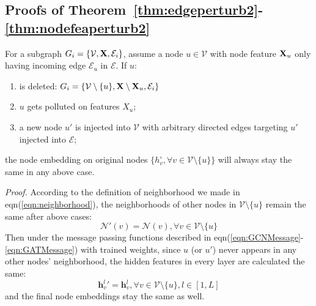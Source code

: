 \subsection{Proofs of Theorem~\ref{thm:edgeperturb2}-\ref{thm:nodefeaperturb2}}
\label{proof:nodepart}
\begin{theorem}%
\label{thm:embUnchange}
For a subgraph $G_{i}=\{\mathcal{V},{\bf X},\mathcal{E}_{i}\}$, assume a node $u\in \mathcal{V}$ with node feature ${\bf X}_{u}$ only having incoming edge $\mathcal{E}_{u}$ in $\mathcal{E}$. If $u$:
\begin{enumerate}
\item is deleted:  $G_{i}=\{\mathcal{V}\setminus\{u\},{\bf X}\setminus\mathbf{X}_{u},\mathcal{E}_{i}\}$
\item $u$ gets polluted on features $X_{u}$; 
\item a new node $u'$ is injected into $\mathcal{V}$ with arbitrary directed edges targeting $u'$ injected into $\mathcal{E}$;
\end{enumerate}
the node embedding on original nodes $\{h^{\circ}_{v},\forall v\in \mathcal{V}\setminus\{u\}\}$ will always stay the same  in any above case.
\end{theorem}
\emph{Proof.} According to the definition of neighborhood we made in eqn(\ref{eqn:neighborhood}), the neighborhoods of other nodes in $\mathcal{V}\setminus\{u\}$ remain the same after above cases:
$$\mathcal{N}'(v) = \mathcal{N}(v), \forall v \in \mathcal{V}\setminus\{u\}$$
Then under the message passing functions described in eqn(\ref{eqn:GCNMessage}-\ref{eqn:GATMessage}) with trained weights, since $u$ (or $u'$) never appears in any other nodes' neighborhood, the hidden features in every layer are calculated the same:
$$\mathbf{h}_{v}^{l}{}' = \mathbf{h}_{v}^{l}, \forall v \in \mathcal{V}\setminus\{u\}, l \in [1,L]$$
and the final node embeddings stay the same as well. 